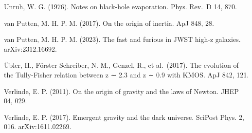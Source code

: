 \documentclass[11pt]{article}
\begin{document}
Unruh, W. G. (1976). Notes on black-hole evaporation. Phys. Rev.~D 14, 870.

van Putten, M. H. P. M. (2017). On the origin of inertia. ApJ 848, 28.

van Putten, M. H. P. M. (2023). The fast and furious in JWST high-z galaxies. arXiv:2312.16692.

Übler, H., Förster Schreiber, N. M., Genzel, R., et al.~(2017). The evolution of the Tully-Fisher relation between z ∼ 2.3 and z ∼ 0.9 with KMOS. ApJ 842, 121.

Verlinde, E. P. (2011). On the origin of gravity and the laws of Newton. JHEP 04, 029.

Verlinde, E. P. (2017). Emergent gravity and the dark universe. SciPost Phys. 2, 016. arXiv:1611.02269.
\par\endgroup
\end{document}
